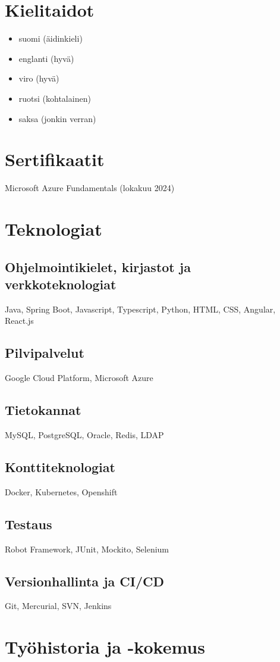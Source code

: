 \documentclass[a4paper,12pt]{article}
\begin{document}
\section*{Kielitaidot}
\begin{itemize}
\item{suomi (äidinkieli)}
\item{englanti (hyvä)}
\item{viro (hyvä)}
\item{ruotsi (kohtalainen)}
\item{saksa (jonkin verran)}
\end{itemize}
\section*{Sertifikaatit}
Microsoft Azure Fundamentals (lokakuu 2024)
\section*{Teknologiat}
\subsection*{Ohjelmointikielet, kirjastot ja verkkoteknologiat}
Java, Spring Boot, Javascript, Typescript, Python, HTML, CSS, Angular, React.js
\subsection*{Pilvipalvelut}
Google Cloud Platform, Microsoft Azure
\subsection*{Tietokannat}
MySQL, PostgreSQL, Oracle, Redis, LDAP
\subsection*{Konttiteknologiat}
Docker, Kubernetes, Openshift
\subsection*{Testaus}
Robot Framework, JUnit, Mockito, Selenium
\subsection*{Versionhallinta ja CI/CD}
Git, Mercurial, SVN, Jenkins
\section*{Työhistoria ja -kokemus}
\end{document}
